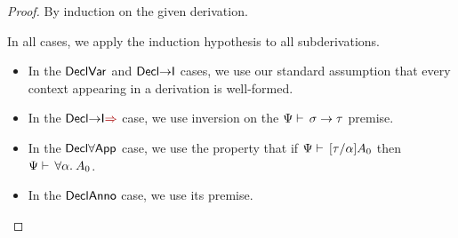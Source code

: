 \documentclass[a4paper]{article}
\newcommand{\mathcolor}[2]{\text{\textcolor{#1}{\ensuremath{#2}}}}
\newcommand{\arr}{\rightarrow}
\def\CompactJudgments{0}
\newcommand{\entails}{\mathrel{\ifnum\CompactJudgments=1\vdash \else \vdash\,\fi}}
\newcommand{\AllSym}{\forall}
\newcommand{\xAll}[1]{\AllSym#1}
\newcommand{\All}[1]{\xAll{#1}.\:}
\newcommand{\syncolor}{dRed}
\newcommand{\uncoloredsyn}{{\Rightarrow}}
\newcommand{\syn}{\mathrel{\mathcolor{\syncolor}{\uncoloredsyn}}}
\newcommand{\alltype}[1]{\All{#1}}
\newcommand{\judgetp}[2]{{#1} \entails {#2}}
\newcommand{\rulename}[1]{\text{\normalfont\textsf{#1}}}
\newcommand{\Decltyrulename}[1]{\ensuremath{\rulename{Decl#1}}\xspace}
\newcommand{\DeclIntrorulename}[1]{\Decltyrulename{\ensuremath{#1}I}}
\newcommand{\DeclIntroSynrulename}[1]{\Decltyrulename{\ensuremath{#1}I$\syn$}}
\newcommand{\DeclApprulename}[1]{\Decltyrulename{\ensuremath{#1}App}}
\newcommand{\DeclVar}{\Decltyrulename{Var}}
\newcommand{\DeclAnno}{\Decltyrulename{Anno}}
\newcommand{\DeclArrIntro}{\DeclIntrorulename{\arr}}
\newcommand{\DeclArrIntroSyn}{\DeclIntroSynrulename{\arr}}
\newcommand{\DeclAllApp}{\DeclApprulename{\forall}}
\begin{document}
\declarativetypingwellformed*
\begin{proof}
  By induction on the given derivation.
  
  In all cases, we apply the induction hypothesis to all subderivations.

  \begin{itemize}
  \item   In the \DeclVar and \DeclArrIntro cases, we use our standard assumption
    that every context appearing in a derivation is well-formed.
  \item  In the \DeclArrIntroSyn case, we use inversion on the $\judgetp{\Psi}{\sigma \arr \tau}$ premise.
  \item  In the \DeclAllApp case, we use the property that if $\judgetp{\Psi}{[\tau/\alpha]A_0}$ then
    $\judgetp{\Psi}{\alltype{\alpha} A_0}$.
  \item  In the \DeclAnno case, we use its premise.
  \qedhere
  \end{itemize}
\end{proof}
\end{document}
